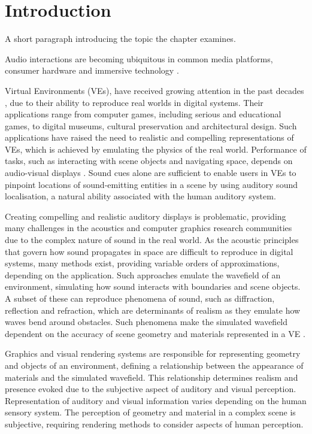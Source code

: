 \chapter{Introduction}\label{ch:introduction}


A short paragraph introducing the topic the chapter examines.

Audio interactions are becoming ubiquitous in common media platforms, consumer hardware and immersive technology \cite{yang2019audio}.

Virtual Environments (VEs), have received growing attention in the past decades \citep{rubio2017immersive}, due to their ability to reproduce real worlds in digital systems. Their applications range from computer games, including serious and educational games, to digital museums, cultural preservation and architectural design. Such applications have raised the need to realistic and compelling representations of VEs, which is achieved by emulating the physics of the real world. Performance of tasks, such as interacting with scene objects and navigating space, depends on audio-visual displays \citep{zimmons2003influence, lokki2005navigation}. Sound cues alone are sufficient to enable users in VEs to pinpoint locations of sound-emitting entities in a scene by using auditory sound localisation, a natural ability associated with the human auditory system. \par
Creating compelling and realistic auditory displays is problematic, providing many challenges in the acoustics and computer graphics research communities due to the complex nature of sound in the real world. As the acoustic principles that govern how sound propagates in space are difficult to reproduce in digital systems, many methods exist, providing variable orders of approximations, depending on the application. Such approaches emulate the wavefield of an environment, simulating how sound interacts with boundaries and scene objects. A subset of these can reproduce phenomena of sound, such as diffraction, reflection and refraction, which are determinants of realism as they emulate how waves bend around obstacles. Such phenomena make the simulated wavefield dependent on the accuracy of scene geometry and materials represented in a VE \citep{kuttruff2016room}. \par
Graphics and visual rendering systems are responsible for representing geometry and objects of an environment, defining a relationship between the appearance of materials and the simulated wavefield. This relationship determines realism and presence evoked due to the subjective aspect of auditory and visual perception.
Representation of auditory and visual information varies depending on the human sensory system. The perception of geometry and material in a complex scene is subjective, requiring rendering methods to consider aspects of human perception. 

